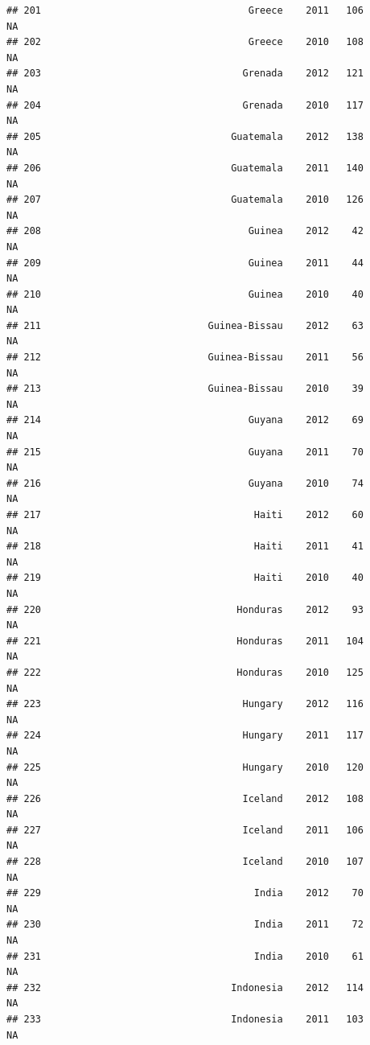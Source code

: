 \documentclass[
]{book}
\begin{document}
\begin{verbatim}
## 201                                    Greece    2011   106              NA
## 202                                    Greece    2010   108              NA
## 203                                   Grenada    2012   121              NA
## 204                                   Grenada    2010   117              NA
## 205                                 Guatemala    2012   138              NA
## 206                                 Guatemala    2011   140              NA
## 207                                 Guatemala    2010   126              NA
## 208                                    Guinea    2012    42              NA
## 209                                    Guinea    2011    44              NA
## 210                                    Guinea    2010    40              NA
## 211                             Guinea-Bissau    2012    63              NA
## 212                             Guinea-Bissau    2011    56              NA
## 213                             Guinea-Bissau    2010    39              NA
## 214                                    Guyana    2012    69              NA
## 215                                    Guyana    2011    70              NA
## 216                                    Guyana    2010    74              NA
## 217                                     Haiti    2012    60              NA
## 218                                     Haiti    2011    41              NA
## 219                                     Haiti    2010    40              NA
## 220                                  Honduras    2012    93              NA
## 221                                  Honduras    2011   104              NA
## 222                                  Honduras    2010   125              NA
## 223                                   Hungary    2012   116              NA
## 224                                   Hungary    2011   117              NA
## 225                                   Hungary    2010   120              NA
## 226                                   Iceland    2012   108              NA
## 227                                   Iceland    2011   106              NA
## 228                                   Iceland    2010   107              NA
## 229                                     India    2012    70              NA
## 230                                     India    2011    72              NA
## 231                                     India    2010    61              NA
## 232                                 Indonesia    2012   114              NA
## 233                                 Indonesia    2011   103              NA

\end{verbatim}
\end{document}
